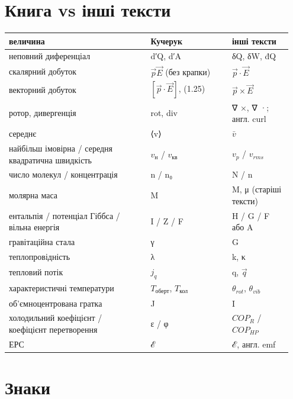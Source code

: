 \documentclass[11pt,a4paper,oneside]{book}
\begin{document}
\section*{Книга vs інші тексти}

{\small
\begin{longtable}{>{\raggedright\arraybackslash}p{0.471\linewidth}>{\raggedright\arraybackslash}p{0.279\linewidth}>{\raggedright\arraybackslash}p{0.202\linewidth}}
\toprule
\textbf{величина} & \textbf{Кучерук} & \textbf{інші тексти} \\
\midrule
\endhead
неповний диференціал & d′Q, d′A & δQ, δW, đQ \\
скалярний добуток & $\vec p\vec E$ (без крапки) & $\vec p\cdot\vec E$ \\
векторний добуток & $[\vec p\cdot\vec E]$, (1.25) & $\vec p\times\vec E$ \\
ротор, дивергенція & rot, div & ∇ ×, ∇ ·; англ. curl \\
середнє & ⟨v⟩ & $\bar v$ \\
найбільш імовірна / середня квадратична швидкість & $v_\text{н}$ / $v_{\text{кв}}$ & $v_p$ / $v_{rms}$ \\
число молекул / концентрація & n / n₀ & N / n \\
молярна маса & M & M, μ (старіші тексти) \\
ентальпія / потенціал Гіббса / вільна енергія & I / Z / F & H / G / F або A \\
гравітаційна стала & γ & G \\
теплопровідність & λ & k, κ \\
тепловий потік & $j_q$ & q, $\vec q$ \\
характеристичні температури & $T_{\text{оберт}}$, $T_{\text{кол}}$ & $θ_{rot}$, $θ_{vib}$ \\
об'ємноцентрована гратка & J & I \\
холодильний коефіцієнт / коефіцієнт перетворення & ε / φ & $COP_{R}$ / $COP_{HP}$ \\
ЕРС & ℰ & ℰ, англ. emf \\
\bottomrule
\end{longtable}
}

\section*{Знаки}
\end{document}
